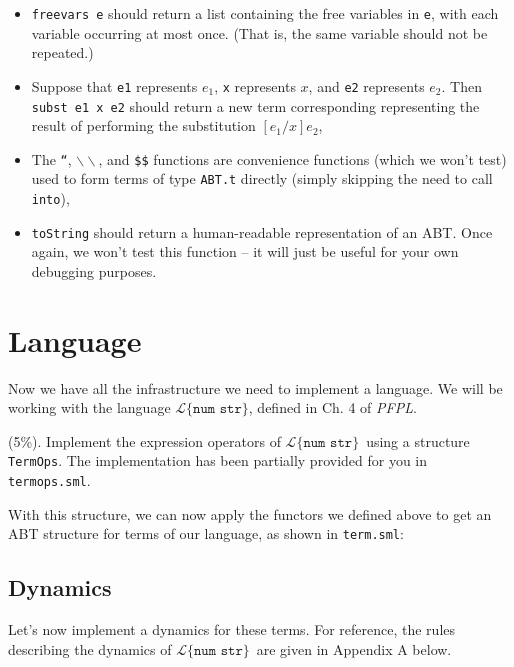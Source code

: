 \documentclass[11pt]{article}
\newcounter{taskcounter}
\newcounter{taskPercentCounter}
\newcommand{\task}[1]
  {\bigskip \noindent {\bf Task\addtocounter{taskPercentCounter}{#1} \arabic{taskcounter}\addtocounter{taskcounter}{1}} (#1\%).}
\begin{document}
\begin{itemize}
\item \texttt{freevars e} should return a list containing the free
  variables in \texttt{e}, with each variable occurring at most once.
  (That is, the same variable should not be repeated.)

\item Suppose that \texttt{e1} represents $e_1$, \texttt{x} represents
  $x$, and \texttt{e2} represents $e_2$. Then \texttt{subst e1 x e2}
  should return a new term corresponding representing the result of
  performing the substitution $[e_1/x]e_2$,

\item The \texttt{``}, $\mathtt{\backslash\backslash}$, and \texttt{\$\$}
  functions are convenience functions (which we won't test) used to form terms of type
  \texttt{ABT.t} directly (simply skipping the need to call \verb|into|),

\item \texttt{toString} should return a human-readable representation
  of an ABT. Once again, we won't test this function -- it will just
  be useful for your own debugging purposes.
\end{itemize}

\section{Language}
\newcommand{\Lnumstr}{$\mathcal{L}\{\texttt{num str}\}$}
Now we have all the infrastructure we need to implement a language. We will be working with the language \Lnumstr, defined in Ch. 4 of \emph{PFPL}.

\task{5} Implement the expression operators of \Lnumstr~using a structure \verb|TermOps|. The implementation has been partially provided for you in \verb|termops.sml|.



\noindent
With this structure, we can now apply the functors we defined above to get an ABT structure for terms of our language, as shown in \verb|term.sml|:



\subsection{Dynamics}
Let's now implement a dynamics for these terms. For reference, the rules describing the dynamics of \Lnumstr~are given in Appendix A below.
\end{document}
